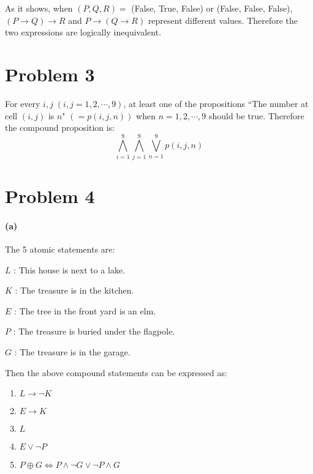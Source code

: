 \documentclass[10pt]{article}
\begin{document}
As it shows, when $(P, Q, R) = $ (False, True, False) or (False, False, False), $(P \rightarrow Q) \rightarrow R$ and $P \rightarrow (Q \rightarrow R)$ represent different values.
Therefore the two expressions are logically inequivalent.

\section*{Problem 3}
For every $i, j \; (i, j = 1, 2, \cdots , 9)$, at least one of the propositions ``The number at cell $(i, j)$ is $n$" $\left(= p(i, j, n)\right)$ when $n = 1, 2, \cdots , 9$ should be true. Therefore the compound proposition is:
$$\bigwedge_{i=1}^{9}\bigwedge_{j=1}^{9}\bigvee_{n=1}^{9}p(i, j, n)$$

\section*{Problem 4}
\paragraph{(a)}
The 5 atomic statements are:

\vspace{0.3cm}
\hspace{0.2cm} $L$ : This house is next to a lake. 

\hspace{0.2cm} $K$ : The treasure is in the kitchen. 

\hspace{0.2cm} $E$ : The tree in the front yard is an elm. 

\hspace{0.2cm} $P$ : The treasure is buried under the flagpole. 

\hspace{0.2cm} $G$ : The treasure is in the garage.

\vspace{0.3cm}
Then the above compound statements can be expressed as:
\begin{enumerate}
  \item $L \rightarrow \neg K$
  \item $E \rightarrow K$
  \item $L$
  \item $E \vee \neg P$
  \item $P \oplus G \Leftrightarrow P \wedge \neg G \vee \neg P \wedge G$
\end{enumerate}
\end{document}

